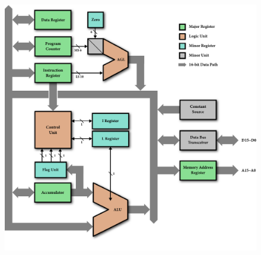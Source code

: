 \documentclass[11pt,a4paper,twocolumns]{article}
\newcommand\register[1]{\textsf{#1}}
\newcommand\MAR{\register{MAR}}
\newcommand\DR{\register{DR}}
\newcommand\PC{\register{PC}}
\newcommand\IR{\register{IR}}
\begin{document}












\begin{figure}
\includegraphics[width=\textwidth]{figs/datapath.pdf}\vspace{2em}\\
\end{figure}
\end{document}
